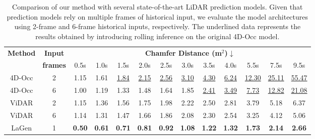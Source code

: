 \begin{table}[ht]
\centering
\caption{Comparison of our method with several state-of-the-art LiDAR prediction models. Given that prediction models rely on multiple frames of historical input, we evaluate the model architectures using 2-frame and 6-frame historical inputs, respectively. The underlined data represents the results obtained by introducing rolling inference on the original 4D-Occ model.}
\renewcommand{\arraystretch}{1.17}
\begin{tabular}{ccccccccccccc}
\toprule
 \textbf{Method} & \textbf{Input} &
\multicolumn{11}{c}{\textbf{Chamfer Distance (m$^2$)$\downarrow$}} \\
\cmidrule(l{3pt}r{3pt}){3-13} 
&\textbf{frames}& 0.5s & 1.0s & 1.5s & 2.0s & 2.5s & 3.0s  & 3.5s & 4.0s & 5.5s & 7.5s & 9.5s\\
\midrule
4D-Occ \cite{khurana2023point}  
& 2 
& 1.15 & 1.61 & \underline{1.84} & \underline{2.15} & \underline{2.56} & \underline{3.10} & \underline{4.30} & \underline{6.24} & \underline{12.30} &  \underline{25.11} & \underline{55.47} \\
4D-Occ  \cite{khurana2023point} 
& 6 
& \cellcolor{Lavender} 1.00 & \cellcolor{Lavender} 1.19 & \cellcolor{Lavender} 1.33 & \cellcolor{Lavender} 1.48 & \cellcolor{Lavender} 1.64 & \cellcolor{Lavender} 1.85 & \underline{2.41} &  \underline{3.49} & \underline{7.73} & \underline{12.82} & \underline{21.08} \\
\midrule
ViDAR \cite{yang2024visual} 
& 2 
& 1.15 & 1.36 & 1.56 & 1.75 & 1.98 & 2.22 & 2.50 & 2.81 & 3.79 & 5.18 & 6.37\\
ViDAR \cite{yang2024visual} 
& 6
& 1.14 & 1.31 & 1.47 & 1.66 & 1.86 & 2.08 & \cellcolor{Lavender} 2.30 & \cellcolor{Lavender} 2.54 & \cellcolor{Lavender} 3.25 & \cellcolor{Lavender} 4.12 & \cellcolor{Lavender} 5.06\\
\midrule
LaGen & 
\cellcolor{rowgray}1
& \cellcolor{LightPink} \textbf{0.50} & \cellcolor{LightPink} \textbf{0.61} & \cellcolor{LightPink} \textbf{0.71} & \cellcolor{LightPink} \textbf{0.81} & \cellcolor{LightPink} \textbf{0.92} & \cellcolor{LightPink} \textbf{1.08}  & \cellcolor{LightPink} \textbf{1.22} & \cellcolor{LightPink} \textbf{1.32} &  \cellcolor{LightPink} \textbf{1.73} & \cellcolor{LightPink} \textbf{2.14} & \cellcolor{LightPink} \textbf{2.66} \\
\bottomrule
\end{tabular}
\label{table_prediction}
\vspace{-3mm}
\end{table}


